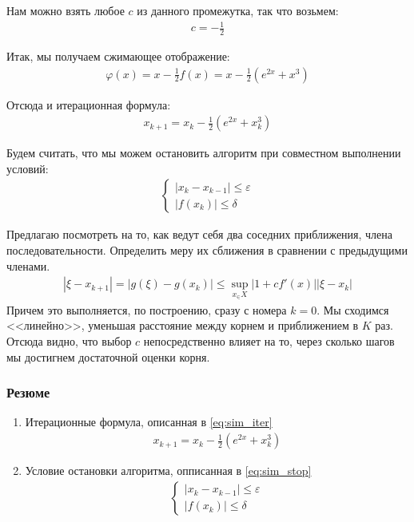 Нам можно взять любое \(c\) из данного промежутка, так что возьмем:
\begin{align}
  c = -\frac{1}{2} 
\end{align}

Итак, мы получаем сжимающее отображение:
\begin{align}
  \varphi(x) = x - \frac{1}{2} f(x) = x - \frac{1}{2} (e^{2x} + x^3)
\end{align}

Отсюда и итерационная формула:
\begin{align}\label{eq:sim_iter}
  x_{k + 1}  = x_k - \frac{1}{2}(e^{2x} + x_k^3)
\end{align}

Будем считать, что мы можем остановить алгоритм при совместном выполнении условий:
\begin{align}\label{eq:sim_stop}
  \begin{cases}
    |x_k - x_{k - 1}| \leq \varepsilon \\
    |f(x_k)| \leq \delta 
  \end{cases} 
\end{align}

Предлагаю посмотреть на то, как ведут себя два соседних приближения, члена последовательности. Определить меру их сближения в сравнении с предыдущими членами.
\begin{align}
  |\xi - x_{k + 1}| = |g(\xi) - g(x_k)| \leq \sup_{x_\in X}|1 + c f'(x)| |\xi - x_k|
\end{align}
Причем это выполняется, по построению, сразу с номера \(k = 0\). Мы сходимся <<линейно>>, уменьшая расстояние между корнем и приближением в \(K\) раз. Отсюда видно, что выбор \(c\) непосредственно влияет на то, через сколько шагов мы достигнем достаточной оценки корня.

\subsubsection{Резюме}
\begin{enumerate}
  \item Итерационные формула, описанная в \cref{eq:sim_iter}
  \begin{align*}
    x_{k + 1}  = x_k - \frac{1}{2}(e^{2x} + x_k^3)
  \end{align*}
\item Условие остановки алгоритма, опписанная в \cref{eq:sim_stop}
\begin{align*}
  \begin{cases}
    |x_k - x_{k - 1}| \leq \varepsilon \\
    |f(x_k)| \leq \delta 
  \end{cases} 
\end{align*}

\end{enumerate}
